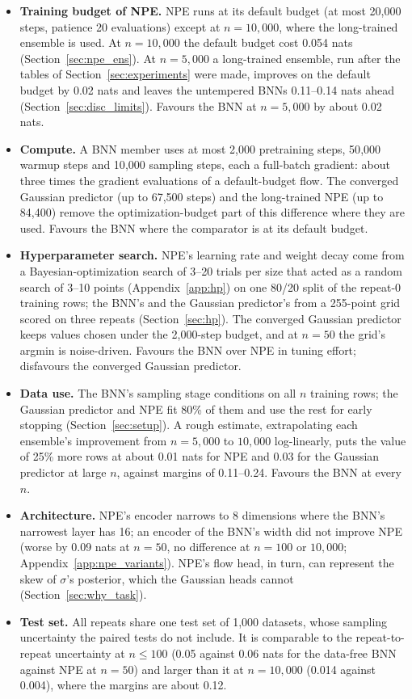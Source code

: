 \documentclass[11pt]{article}
\begin{document}
\begin{itemize}
\item \textbf{Training budget of NPE.} NPE runs at its default budget (at most 20{,}000 steps, patience 20 evaluations)
  except at $n=10{,}000$, where the long-trained ensemble is used. At $n=10{,}000$ the default budget cost 0.054 nats
  (Section~\ref{sec:npe_ens}). At $n=5{,}000$ a long-trained ensemble, run after the tables of Section~\ref{sec:experiments}
  were made, improves on the default budget by 0.02 nats and leaves the untempered BNNs 0.11--0.14 nats ahead
  (Section~\ref{sec:disc_limits}). Favours the BNN at $n=5{,}000$ by about 0.02 nats.
\item \textbf{Compute.} A BNN member uses at most 2{,}000 pretraining steps, 50{,}000 warmup steps and 10{,}000 sampling
  steps, each a full-batch gradient: about three times the gradient evaluations of a default-budget flow. The converged
  Gaussian predictor (up to 67{,}500 steps) and the long-trained NPE (up to 84{,}400) remove the optimization-budget part of
  this difference where they are used. Favours the BNN where the comparator is at its default budget.
\item \textbf{Hyperparameter search.} NPE's learning rate and weight decay come from a Bayesian-optimization search of
  3--20 trials per size that acted as a random search of 3--10 points (Appendix~\ref{app:hp}) on one 80/20 split of the repeat-0 training rows; the BNN's and the Gaussian predictor's from a
  255-point grid scored on three repeats (Section~\ref{sec:hp}). The converged Gaussian predictor keeps values chosen
  under the 2{,}000-step budget, and at $n=50$ the grid's argmin is noise-driven. Favours the BNN over NPE in tuning
  effort; disfavours the converged Gaussian predictor.
\item \textbf{Data use.} The BNN's sampling stage conditions on all $n$ training rows; the Gaussian predictor and NPE fit
  80\% of them and use the rest for early stopping (Section~\ref{sec:setup}). A rough estimate, extrapolating each
  ensemble's improvement from $n=5{,}000$ to $10{,}000$ log-linearly, puts the value of 25\% more rows at about 0.01
  nats for NPE and 0.03 for the Gaussian predictor at large $n$, against margins of 0.11--0.24. Favours the BNN at every
  $n$.
\item \textbf{Architecture.} NPE's encoder narrows to 8 dimensions where the BNN's narrowest layer has 16; an encoder of
  the BNN's width did not improve NPE (worse by 0.09 nats at $n=50$, no difference at $n=100$ or $10{,}000$;
  Appendix~\ref{app:npe_variants}). NPE's flow head, in turn, can represent the skew of $\sigma$'s posterior, which the Gaussian heads
  cannot (Section~\ref{sec:why_task}).
\item \textbf{Test set.} All repeats share one test set of 1{,}000 datasets, whose sampling uncertainty the paired tests do
  not include. It is comparable to the repeat-to-repeat uncertainty at $n\le100$ (0.05 against 0.06 nats for the
  data-free BNN against NPE at $n=50$) and larger than it at $n=10{,}000$ (0.014 against 0.004), where the margins are about
  0.12.
\end{itemize}
\end{document}
